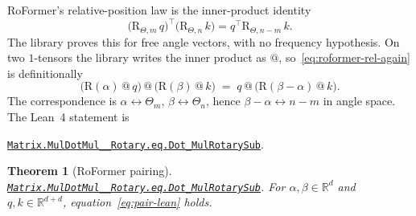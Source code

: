 \documentclass[11pt,a4paper]{article}
\newcommand{\lmod}[1]{\href{http://www.lemma.cn/lean/?module=#1}{\nolinkurl{#1}}}
\newtheorem{theorem}{Theorem}[section]
\newcommand{\R}{\mathbb{R}}
\newcommand{\rot}{\mathrm{R}}
\begin{document}
RoFormer's relative-position law is the inner-product identity
\begin{equation}
  \label{eq:roformer-rel-again}
  \bigl(\rot_{\Theta,m}\,q\bigr)^\top\bigl(\rot_{\Theta,n}\,k\bigr)
  = q^\top \rot_{\Theta,n-m}\,k.
\end{equation}
The library proves this for free angle vectors, with no frequency hypothesis.
On two \(1\)-tensors the library writes the inner product as \(@\), so~\eqref{eq:roformer-rel-again} is definitionally
\begin{equation}
  \label{eq:pair-lean}
  \bigl(\rot(\alpha)\,@\,q\bigr)\,@\,\bigl(\rot(\beta)\,@\,k\bigr)
  \;=\;
  q\,@\,\bigl(\rot(\beta-\alpha)\,@\,k\bigr).
\end{equation}
The correspondence is \(\alpha\leftrightarrow\Theta_m\), \(\beta\leftrightarrow\Theta_n\), hence \(\beta-\alpha\leftrightarrow n-m\) in angle space.
The Lean~4 statement is
\begin{center}
\lmod{Matrix.MulDotMul__Rotary.eq.Dot_MulRotarySub}.
\end{center}

\begin{theorem}[RoFormer pairing]
\label{thm:pair}
\lmod{Matrix.MulDotMul__Rotary.eq.Dot_MulRotarySub}.
For \(\alpha,\beta\in\R^d\) and \(q,k\in\R^{d+d}\),
equation~\eqref{eq:pair-lean} holds.
\end{theorem}
\end{document}
